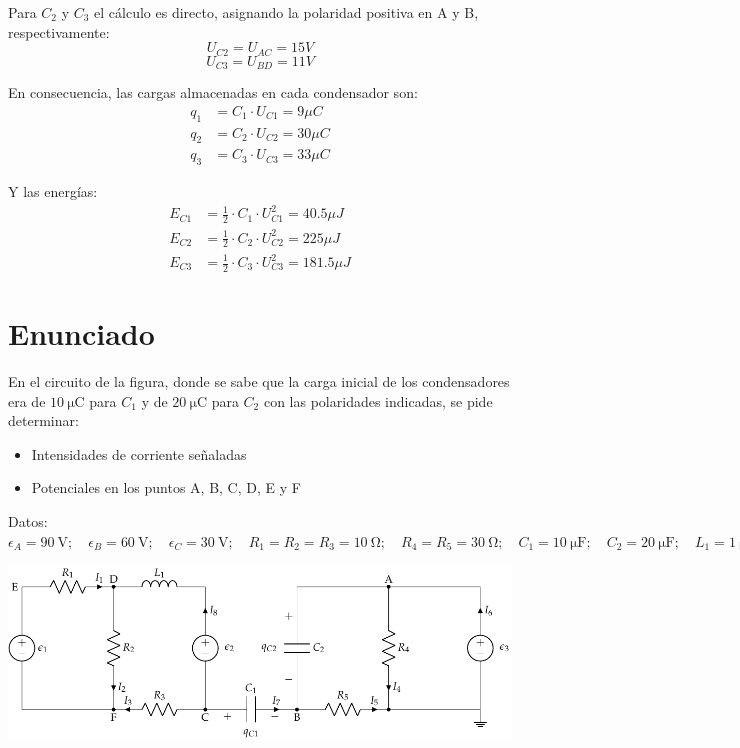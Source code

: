 Para $C_2$ y $C_3$ el cálculo es directo, asignando la polaridad
positiva en A y B, respectivamente:
\begin{equation*}
  U_{C2} =  U_{AC} = {{15} V}
\end{equation*}
\begin{equation*}
  U_{C3} =  U_{BD} = {{11} V}
\end{equation*}
  

En consecuencia, las cargas almacenadas en cada condensador son:
\begin{align*}
  q_1 &= C_1 \cdot U_{C1} = {{9}{\mu C}}\\
  q_2&= C_2 \cdot U_{C2} = {{30}{\mu C}}\\
  q_3 &= C_3 \cdot U_{C3} = {{33}{\mu C}}
\end{align*}
  
Y las energías:
\begin{align*}
  E_{C1} &= \frac{1}{2} \cdot C_1 \cdot U^2_{C1} = {{40.5}{\mu J}}\\
  E_{C2} &= \frac{1}{2} \cdot C_2 \cdot U^2_{C2} = {{225}{\mu J}}\\
  E_{C3} &= \frac{1}{2} \cdot C_3 \cdot U^2_{C3} = {{181.5}{\mu J}}
\end{align*}
  

\section{Enunciado}

En el circuito de la figura, donde se sabe que la carga inicial de los
condensadores era de $\qty{10}{\micro\coulomb}$ para $C_1$ y de
$\qty{20}{\micro\coulomb}$ para $C_2$ con las polaridades indicadas,
se pide determinar:
\begin{itemize}
\item Intensidades de corriente señaladas
\item Potenciales en los puntos A, B, C, D, E y F
\end{itemize}

Datos:
$\epsilon_{A}=\SI{90}{\volt};\quad \epsilon_{B}=\SI{60}{\volt};\quad
\epsilon_{C}=\SI{30}{\volt};\quad R_{1}= R_2 = R_3 =
\SI{10}{\ohm};\quad R_{4}= R_5 = \SI{30}{\ohm};\quad C_{1}=
\SI{10}{\micro\farad};\quad C_{2}= \SI{20}{\micro\farad};\quad L_1 =
\SI{1}{\micro\henry}$

\begin{center}
  \includegraphics[scale = 0.8]{figuras/mallas_carga_inicial.pdf}
\end{center}


